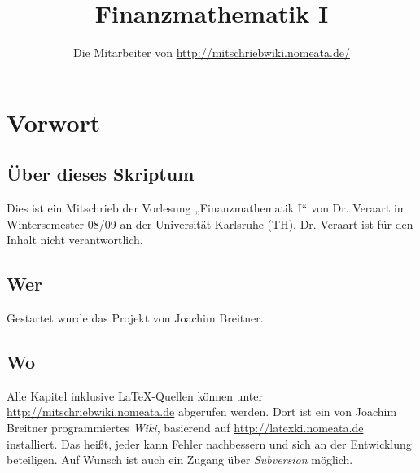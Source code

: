 \documentclass[a4paper,twoside,DIV15,BCOR12mm]{scrbook}
\author{Die Mitarbeiter von \url{http://mitschriebwiki.nomeata.de/}}
\title{Finanzmathematik I}
\begin{document}
\maketitle
 
\newenvironment{enuma}{%
\begin{enumerate}[\hspace{1em}a)]%
}{%
\end{enumerate}%
}
\newenvironment{enumi}{%
\begin{enumerate}[\hspace{1em}i)]%
}{%
\end{enumerate}%
}

\setcounter{secnumdepth}{-1}
\tableofcontents


\chapter{Vorwort}
\setcounter{secnumdepth}{2}

\section*{Über dieses Skriptum}
Dies ist ein Mitschrieb der Vorlesung „Finanzmathematik I“ von Dr. Veraart im
Wintersemester 08/09 an der Universität Karlsruhe (TH).
Dr. Veraart ist für  den Inhalt nicht verantwortlich.
\section*{Wer}
Gestartet wurde das Projekt von Joachim Breitner.

\section*{Wo}
Alle Kapitel inklusive \LaTeX-Quellen können unter \url{http://mitschriebwiki.nomeata.de} abgerufen werden.
Dort ist ein von Joachim Breitner programmiertes \emph{Wiki}, basierend auf \url{http://latexki.nomeata.de} installiert. 
Das heißt, jeder kann Fehler nachbessern und sich an der Entwicklung
beteiligen. Auf Wunsch ist auch ein Zugang über \emph{Subversion} möglich.
\end{document}
